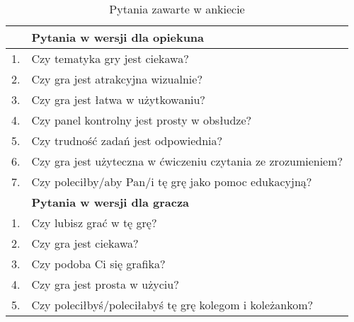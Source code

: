         \begin{table}[H]
            \caption{Pytania zawarte w ankiecie}
            \label{table:ankieta}
            \begin{tabularx}{\textwidth}{ l X }
             \hline
             
             \hline
                & \textbf{Pytania w wersji dla opiekuna} \\
             \hline
             1. & Czy tematyka gry jest ciekawa? \\
             2. & Czy gra jest atrakcyjna wizualnie? \\
             3. & Czy gra jest łatwa w użytkowaniu? \\
             4. & Czy panel kontrolny jest prosty w obsłudze? \\
             5. & Czy trudność zadań jest odpowiednia? \\
             6. & Czy gra jest użyteczna w ćwiczeniu czytania ze zrozumieniem? \\
             7. & Czy poleciłby/aby Pan/i tę grę jako pomoc edukacyjną? \\
             \hline
             
             \hline
                & \textbf{Pytania w wersji dla gracza} \\
             \hline
                1. & Czy lubisz grać w tę grę? \\
                2. & Czy gra jest ciekawa? \\
                3. & Czy podoba Ci się grafika? \\
                4. & Czy gra jest prosta w użyciu? \\
                5. & Czy poleciłbyś/poleciłabyś tę grę kolegom i koleżankom? \\
             \hline
             
             \hline
            \end{tabularx}
        \end{table}


